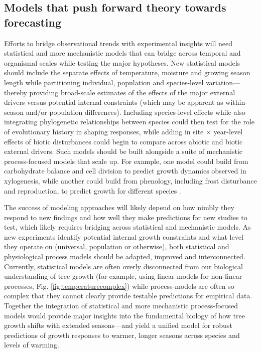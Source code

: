 \documentclass[11pt]{article}
\begin{document}
\subsection*{Models that push forward theory towards forecasting}
Efforts to bridge observational trends with experimental insights will need statistical and more mechanistic models that can bridge across temporal and organismal scales while testing the major hypotheses. New statistical models should include the separate effects of temperature, moisture and growing season length while partitioning individual, population and species-level variation---thereby providing broad-scale estimates of the effects of the major external drivers versus potential internal constraints (which may be apparent as within-season and/or population differences). Including species-level effects while also integrating phylogenetic relationships between species could then test for the role of evolutionary history in shaping responses, while adding in site $\times$ year-level effects of biotic disturbances could begin to compare across abiotic and biotic external drivers. Such models should be built alongside a suite of mechanistic process-focused models that scale up. For example, one model could build from carbohydrate balance and cell division \citep[e.g.][]{locosselli2017dendrobiochemistry} to predict growth dynamics observed in xylogenesis, while another could build from phenology, including frost disturbance and reproduction, to predict growth for different species \citep[e.g.][]{chuineJTB}. 

The success of modeling approaches will likely depend on how nimbly they respond to new findings and how well they make predictions for new studies to test, which likely requires bridging across statistical and mechanistic models. As new experiments identify potential internal growth constraints and what level they operate on (universal, population or otherwise), both statistical and physiological process models should be adapted, improved and interconnected. Currently, statistical models are often overly disconnected from our biological understanding of tree growth (for example, using linear models for non-linear processes, Fig. \ref{fig:temperaturecomplex}) while process-models are often so complex that they cannot clearly provide testable predictions for empirical data. Together the integration of statistical and more mechanistic process-focused models would provide major insights into the fundamental biology of how tree growth shifts with extended seasons---and yield a unified model for robust predictions of growth responses to warmer, longer seasons across species and levels of warming. 
\end{document}
